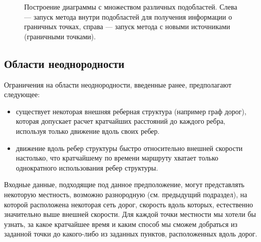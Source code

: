 \documentclass[12pt]{article}
\begin{document}
\begin{figure}
\begin{center}
\end{center}
\caption{Построение диаграммы с множеством различных подобластей. 
Слева --- запуск метода внутри подобластей
для получения информации о граничных точках, справа --- запуск метода
с новыми источниками (граничными точками).}
\label{multi_type_fig}
\end{figure}

\subsection{Области неоднородности}
Ограничения на области неоднородности, введенные ранее, предполагают следующее:
\begin{itemize}
\item существует некоторая внешняя реберная структура (например граф дорог), 
которая допускает расчет кратчайших расстояний до каждого ребра, используя
только движение вдоль своих ребер.
\item движение вдоль ребер структуры быстро относительно внешней скорости 
настолько, что кратчайшему по времени маршруту хватает только однократного использования
ребер структуры.
\end{itemize}
Входные данные, подходящие под данное предположение, могут представлять
некоторую местность, возможно разнородную (см. предыдущий подраздел), на которой
расположена некоторая сеть дорог, скорость вдоль которых, естественно
значительно выше внешней скорости. Для каждой точки местности мы хотели 
бы узнать, за какое кратчайшее время и каким способ мы сможем добраться 
из заданной точки до какого-либо из заданных пунктов, расположенных вдоль дорог.
\end{document}
